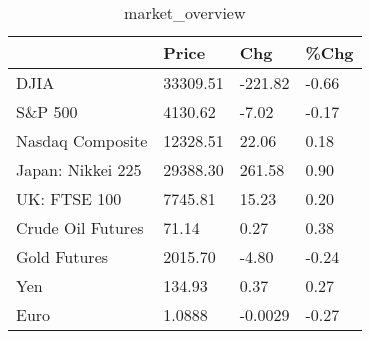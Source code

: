 \documentclass{article}%
\begin{document}
%


\begin{table}[htbp]%
\caption{market\_overview}%
\centering%
\begin{adjustbox}{width=1\textwidth}%
\begin{tabular}{llll}
\toprule
                  &    Price &     Chg &  \%Chg \\
\midrule
             DJIA & 33309.51 & -221.82 & -0.66 \\
          S\&P 500 &  4130.62 &   -7.02 & -0.17 \\
 Nasdaq Composite & 12328.51 &   22.06 &  0.18 \\
Japan: Nikkei 225 & 29388.30 &  261.58 &  0.90 \\
     UK: FTSE 100 &  7745.81 &   15.23 &  0.20 \\
Crude Oil Futures &    71.14 &    0.27 &  0.38 \\
     Gold Futures &  2015.70 &   -4.80 & -0.24 \\
              Yen &   134.93 &    0.37 &  0.27 \\
             Euro &   1.0888 & -0.0029 & -0.27 \\
\bottomrule
\end{tabular}
%
\end{adjustbox}%
\end{table}

%
\end{document}
